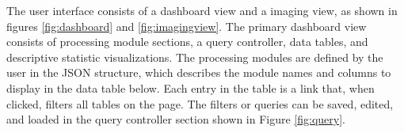 The user interface consists of a dashboard view and a imaging view, as shown in figures \ref{fig:dashboard} and \ref{fig:imagingview}. The primary dashboard view consists of processing module sections, a query controller, data tables, and descriptive statistic visualizations. The processing modules are defined by the user in the JSON structure, which describes the module names and columns to display in the data table below. Each entry in the table is a link that, when clicked, filters all tables on the page. The filters or queries can be saved, edited, and loaded in the query controller section shown in Figure \ref{fig:query}. 
